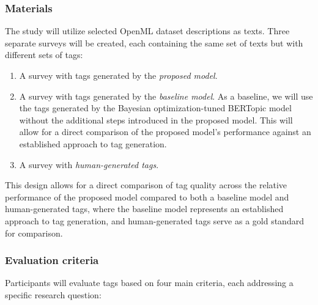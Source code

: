 \subsubsection{Materials}
The study will utilize selected OpenML dataset descriptions as texts. Three separate surveys will be created, each containing the same set of texts but with different sets of tags:

\begin{enumerate}
\item A survey with tags generated by the \textit{proposed model}.
\item A survey with tags generated by the \textit{baseline model}. As a baseline, we will use the tags generated by the Bayesian optimization-tuned BERTopic model without the additional steps introduced in the proposed model. This will allow for a direct comparison of the proposed model's performance against an established approach to tag generation.
\item A survey with \textit{human-generated tags}.
\end{enumerate}

This design allows for a direct comparison of tag quality across the relative performance of the proposed model compared to both a baseline model and human-generated tags, where the baseline model represents an established approach to tag generation, and human-generated tags serve as a gold standard for comparison.

\subsubsection{Evaluation criteria}
Participants will evaluate tags based on four main criteria, each addressing a specific research question:

